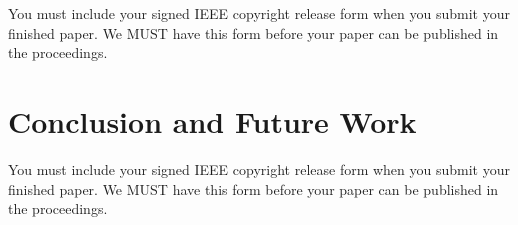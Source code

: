 \documentclass[10pt,twocolumn,letterpaper]{article}
\begin{document}
You must include your signed IEEE copyright release form when you submit
your finished paper. We MUST have this form before your paper can be
published in the proceedings.

\section{Conclusion and Future Work}

You must include your signed IEEE copyright release form when you submit
your finished paper. We MUST have this form before your paper can be
published in the proceedings.

{\small


}
\end{document}
